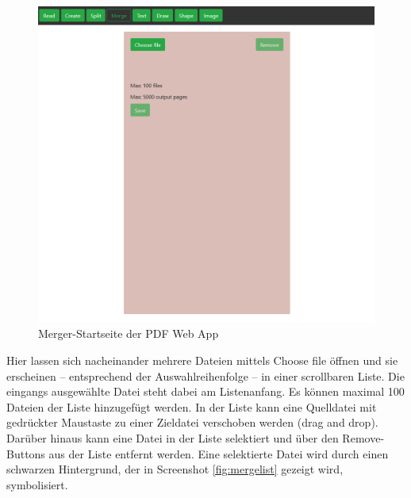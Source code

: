 \begin{figure}[!htbp]
	\centering
	\includegraphics[width=1\textwidth]{"images/merger.png"}
	\caption{Merger-Startseite der PDF Web App}
	\label{fig:merger}
\end{figure}

Hier lassen sich nacheinander mehrere Dateien mittels Choose file öffnen und sie erscheinen – entsprechend der Auswahlreihenfolge – in einer scrollbaren Liste. Die eingangs ausgewählte Datei steht dabei am Listenanfang. Es können maximal 100 Dateien der Liste hinzugefügt werden. In der Liste kann eine Quelldatei mit gedrückter Maustaste zu einer Zieldatei verschoben werden (drag and drop). Darüber hinaus  kann eine Datei in der Liste selektiert und über den Remove-Buttons aus der Liste entfernt werden. Eine selektierte Datei wird durch einen schwarzen Hintergrund, der in Screenshot \ref{fig:mergelist} gezeigt wird, symbolisiert.

